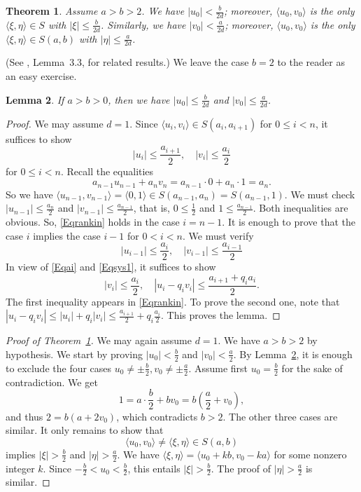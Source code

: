 \documentclass[12pt,letterpaper]{article}
\newtheorem{thm}{Theorem}%
\newtheorem{lem}[thm]{Lemma} %
\theoremstyle{definition}
\begin{document}
\begin{thm}\label{Trankin}
Assume $a>b>2$. We have $|u_0|<\frac{b}{2d}$; moreover, $\langle u_0,v_0\rangle$ is the only $\langle\xi,\eta\rangle\in S$ with $|\xi|\le\frac{b}{2d}$. Similarly, we have $|v_0|<\frac{a}{2d}$; moreover, $\langle u_0,v_0\rangle$ is the only $\langle\xi,\eta\rangle\in S(a,b)$ with $|\eta|\le\frac{a}{2d}$. 
\end{thm} 

(See \cite{gaillard_2026_euclidean}, Lemma~3.3, for related results.) We leave the case $b=2$ to the reader as an easy exercise. 

\begin{lem}\label{Lrankin}
If $a>b>0$, then we have $|u_0|\le\frac{b}{2d}$ and $|v_0|\le\frac{a}{2d}$. 
\end{lem} 

\begin{proof}
We may assume $d=1$. Since $\langle u_i,v_i\rangle\in S(a_i,a_{i+1})$ for $0\le i<n$, it suffices to show 
\begin{equation}\label{Eqrankin}
|u_i|\le\frac{a_{i+1}}{2},\quad |v_i|\le\frac{a_i}{2}
\end{equation} 
for $0\le i<n$. Recall the equalities 
$$
a_{n-1} u_{n-1} + a_n v_n = a_{n-1} \cdot 0 + a_n \cdot 1 = a_n.
$$ 
So we have $\langle u_{n-1},v_{n-1}\rangle=\langle 0,1\rangle\in S(a_{n-1},a_n)=S(a_{n-1},1)$. We must check $|u_{n-1}|\le\frac{a_n}{2}$ and $|v_{n-1}|\le\frac{a_{n-1}}{2}$, that is, $0\le\frac{1}{2}$ and $1\le\frac{a_{n-1}}{2}$. Both inequalities are obvious. So, \eqref{Eqrankin} holds in the case $i=n-1$. It is enough to prove that the case $i$ implies the case $i-1$ for $0<i<n$. We must verify 
$$
|u_{i-1}|\le\frac{a_i}{2},\quad |v_{i-1}|\le\frac{a_{i-1}}{2}
$$ 
In view of \eqref{Eqai} and \eqref{Eqsys1}, it suffices to show 
$$
|v_i|\le\frac{a_i}{2},\quad |u_i-q_iv_i|\le\frac{a_{i+1}+q_ia_i}{2}.
$$ 
The first inequality appears in \eqref{Eqrankin}. To prove the second one, note that $|u_i-q_iv_i|\le|u_i|+q_i|v_i|\le\frac{a_{i+1}}{2}+q_i\frac{a_i}{2}$. This proves the lemma. 
\end{proof}

\begin{proof}[Proof of Theorem~\ref{Trankin}] 
We may again assume $d=1$. We have $a>b>2$ by hypothesis. We start by proving $|u_0|<\frac{b}{2}$ and $|v_0|<\frac{a}{2}$. By Lemma~\ref{Lrankin}, it is enough to exclude the four cases $u_0\ne\pm\frac{b}{2}, v_0\ne\pm\frac{a}{2}$. Assume first $u_0=\frac{b}{2}$ for the sake of contradiction. We get 
$$
1=a\cdot\frac{b}{2}+bv_0=b\left(\frac{a}{2}+v_0\right),
$$ 
and thus $2=b(a+2v_0)$, which contradicts $b>2$. The other three cases are similar. It only remains to show that 
$$
\langle u_0,v_0\rangle\ne\langle\xi,\eta\rangle\in S(a,b)
$$ 
implies $|\xi|>\frac{b}{2}$ and $|\eta|>\frac{a}{2}$. We have $\langle\xi,\eta\rangle=\langle u_0+kb,v_0-ka\rangle$ for some nonzero integer $k$. Since $-\frac{b}{2}<u_0<\frac{b}{2}$, this entails $|\xi|>\frac{b}{2}$. The proof of $|\eta|>\frac{a}{2}$ is similar. 
\end{proof} 
\end{document}
